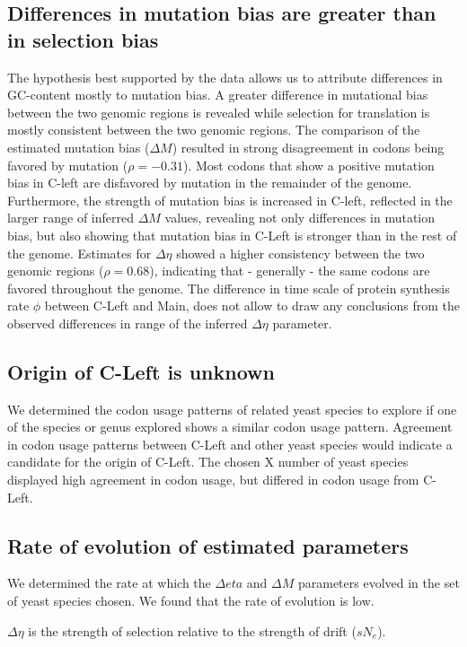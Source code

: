 \documentclass[12pt,draft]{article}
\begin{document}
\subsection*{Differences in mutation bias are greater than in selection bias}
The hypothesis best supported by the data allows us to attribute differences in GC-content mostly to mutation bias. 
A greater difference in mutational bias between the two genomic regions is revealed while selection for translation is mostly consistent between the two genomic regions. 
The comparison of the estimated mutation bias ($\Delta M$) resulted in strong disagreement in codons being favored by mutation ($\rho = -0.31$). 
Most codons that show a positive mutation bias in C-left are disfavored by mutation in the remainder of the genome.  
Furthermore, the strength of mutation bias is increased in C-left, reflected in the larger range of inferred $\Delta M$ values, revealing not only differences in mutation bias, but also showing that mutation bias in C-Left is stronger than in the rest of the genome. 
Estimates for $\Delta \eta$ showed a higher consistency between the two genomic regions ($\rho = 0.68$), indicating that - generally - the same codons are favored throughout the genome. 
The difference in time scale of protein synthesis rate $\phi$ between C-Left and Main, does not allow to draw any conclusions from the observed differences in range of the inferred $\Delta \eta$ parameter.

\subsection*{Origin of C-Left is unknown}
We determined the codon usage patterns of related yeast species to explore if one of the species or genus explored shows a similar codon usage pattern.
Agreement in codon usage patterns between C-Left and other yeast species would indicate a candidate for the origin of C-Left.
The chosen X number of yeast species displayed high agreement in codon usage, but differed in codon usage from C-Left.

\subsection*{Rate of evolution of estimated parameters}
We determined the rate at which the $\Delta eta$ and $\Delta M$ parameters evolved in the set of yeast species chosen.
We found that the rate of evolution is low.

$\Delta \eta$ is the strength of selection relative to the strength of drift ($sN_e$).
\end{document}
